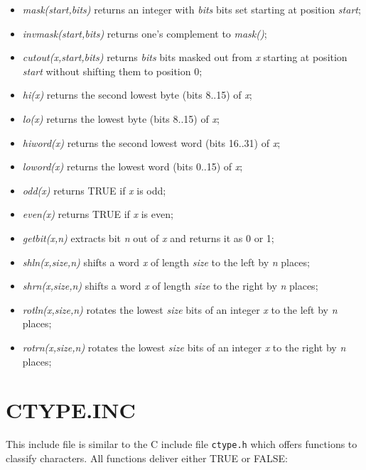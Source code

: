 \documentclass[12pt,twoside]{report}
\begin{document}
\begin{itemize}
\item{{\em mask(start,bits)} returns an integer with {\em bits} bits set
      starting at position {\em start};}
\item{{\em invmask(start,bits)} returns one's complement to {\em
      mask()};}
\item{{\em cutout(x,start,bits)} returns {\em bits} bits masked out from
      {\em x} starting at position {\em start} without shifting them to 
      position 0;}
\item{{\em hi(x)} returns the second lowest byte (bits 8..15) of {\em
      x};}
\item{{\em lo(x)} returns the lowest byte (bits 8..15) of {\em x};}
\item{{\em hiword(x)} returns the second lowest word (bits 16..31) of
      {\em x};}
\item{{\em loword(x)} returns the lowest word (bits 0..15) of {\em x};}
\item{{\em odd(x)} returns TRUE if {\em x} is odd;}
\item{{\em even(x)} returns TRUE if {\em x} is even;}
\item{{\em getbit(x,n)} extracts bit {\em n} out of {\em x} and returns
      it as 0 or 1;}
\item{{\em shln(x,size,n)} shifts a word {\em x} of length {\em size} to
      the left by {\em n} places;}
\item{{\em shrn(x,size,n)} shifts a word {\em x} of length {\em size} to
      the right by {\em n} places;}
\item{{\em rotln(x,size,n)} rotates the lowest {\em size} bits of an
      integer {\em x} to the left by {\em n} places;}
\item{{\em rotrn(x,size,n)} rotates the lowest {\em size} bits of an
      integer {\em x} to the right by {\em n} places;}
\end{itemize}

\section{CTYPE.INC}

This include file is similar to the C include file {\tt ctype.h} which
offers functions to classify characters.  All functions deliver either
TRUE or FALSE:
\end{document}
